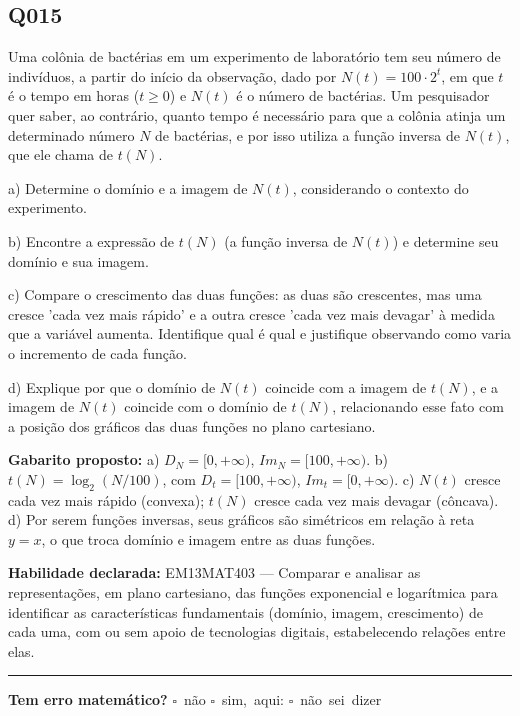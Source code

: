 \documentclass[11pt,a4paper]{article}
\begin{document}
\begin{samepage}
\subsection*{Q015}
Uma colônia de bactérias em um experimento de laboratório tem seu número de indivíduos, a partir do início da observação, dado por $N(t) = 100 \cdot 2^{t}$, em que $t$ é o tempo em horas ($t \geq 0$) e $N(t)$ é o número de bactérias. Um pesquisador quer saber, ao contrário, quanto tempo é necessário para que a colônia atinja um determinado número $N$ de bactérias, e por isso utiliza a função inversa de $N(t)$, que ele chama de $t(N)$.

a) Determine o domínio e a imagem de $N(t)$, considerando o contexto do experimento.

b) Encontre a expressão de $t(N)$ (a função inversa de $N(t)$) e determine seu domínio e sua imagem.

c) Compare o crescimento das duas funções: as duas são crescentes, mas uma cresce 'cada vez mais rápido' e a outra cresce 'cada vez mais devagar' à medida que a variável aumenta. Identifique qual é qual e justifique observando como varia o incremento de cada função.

d) Explique por que o domínio de $N(t)$ coincide com a imagem de $t(N)$, e a imagem de $N(t)$ coincide com o domínio de $t(N)$, relacionando esse fato com a posição dos gráficos das duas funções no plano cartesiano.

\textbf{Gabarito proposto:} a) $D_N=[0,+\infty)$, $Im_N=[100,+\infty)$. b) $t(N)=\log_2(N/100)$, com $D_t=[100,+\infty)$, $Im_t=[0,+\infty)$. c) $N(t)$ cresce cada vez mais rápido (convexa); $t(N)$ cresce cada vez mais devagar (côncava). d) Por serem funções inversas, seus gráficos são simétricos em relação à reta $y=x$, o que troca domínio e imagem entre as duas funções.

\textbf{Habilidade declarada:} EM13MAT403 --- Comparar e analisar as representações, em plano cartesiano, das funções exponencial e logarítmica para identificar as características fundamentais (domínio, imagem, crescimento) de cada uma, com ou sem apoio de tecnologias digitais, estabelecendo relações entre elas.
\end{samepage}

\noindent\rule{\linewidth}{0.4pt}
\textbf{Tem erro matemático?}\quad
\mbox{$\square$~não} \quad \mbox{$\square$~sim, aqui:} \underline{\hspace{5cm}}
\quad \mbox{$\square$~não sei dizer}
\end{document}
